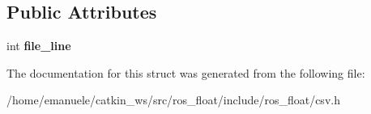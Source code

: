 \subsection*{Public Attributes}
\begin{DoxyCompactItemize}
\item 
\mbox{\label{structio_1_1error_1_1with__file__line_a391298c37172bcdb83aeb3daf65d5a0e}} 
int {\bfseries file\+\_\+line}
\end{DoxyCompactItemize}


The documentation for this struct was generated from the following file\+:\begin{DoxyCompactItemize}
\item 
/home/emanuele/catkin\+\_\+ws/src/ros\+\_\+float/include/ros\+\_\+float/csv.\+h\end{DoxyCompactItemize}
